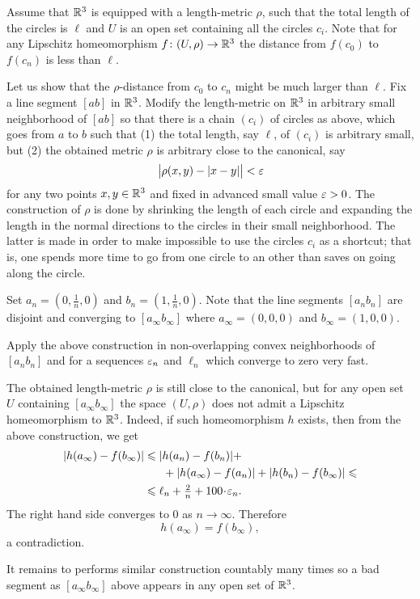 Assume that $\mathbb{R}^3$ is equipped with a length-metric $\rho$,
such that the total length of the circles is $\ell$
and $U$ is an open set containing all the circles $c_i$.
Note that for any Lipschitz homeomorphism $f\colon(U,\rho)\to\mathbb{R}^3$ the distance from $f(c_0)$ to $f(c_n)$ is less than $\ell$.

Let us show that the $\rho$-distance from $c_0$ to $c_n$ might be much larger than $\ell$.
Fix a line segment $[ab]$ in $\mathbb{R}^3$.
Modify 
the length-metric on $\mathbb{R}^3$ in arbitrary small neighborhood of $[ab]$
so that there is a chain $(c_i)$ of circles as above,
which goes from $a$ to $b$ 
such that
(1) the total length, say $\ell$, 
of $(c_i)$ is arbitrary small,
but 
(2) the obtained metric $\rho$ 
is arbitrary close to the canonical, say
\[\bigl|\rho(x,y)-|x-y|\bigr|<\varepsilon\]
for any two points $x,y\in\mathbb{R}^3$
and fixed in advanced small value $\varepsilon>0$.
The construction of $\rho$ 
is done by shrinking the length of each circle
and expanding the length in the normal directions  
to the circles in their small neighborhood.
The latter is made in order to make impossible to use the circles $c_i$ as a shortcut;
that is, one spends more time to go from one circle to an other 
than saves on going along the circle.

Set $a_n=(0,\tfrac1n,0)$ and $b_n=(1,\tfrac1n,0)$.
Note that the line segments $[a_nb_n]$ are disjoint and converging
to $[a_\infty b_\infty]$
where $a_\infty=(0,0,0)$ and $b_\infty=(1,0,0)$.

Apply the above construction in non-overlapping convex neighborhoods of $[a_nb_n]$ 
and for a sequences 
$\varepsilon_n$ and $\ell_n$ 
which converge to zero very fast.

The obtained length-metric $\rho$ is still close to the canonical,
but for any open set $U$ containing $[a_\infty b_\infty]$
the space $(U,\rho)$ does not admit 
a Lipschitz homeomorphism to $\mathbb{R}^3$.
Indeed, 
if such homeomorphism $h$ exists, 
then 
from the above construction,
we get 
\begin{align*}
|h(a_\infty)-f(b_\infty)|
&\le 
|h(a_n)-f(b_n)|
+
\\
&\ \ \ \ \ +
|h(a_\infty)-f(a_n)|
+
|h(b_n)-f(b_\infty)|
\le
\\
&\le
\ell_n+\tfrac2n+100\cdot\eps_n.
\end{align*}
The right hand side converges to $0$ as $n\to\infty$.
Therefore 
\[h(a_\infty)=f(b_\infty),\] 
a contradiction.

It remains to performs similar construction countably many times so a bad segment as $[a_\infty b_\infty]$ above
appears in any open set of $\mathbb{R}^3$.\qeds



